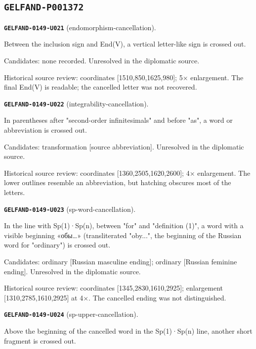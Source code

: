 \documentclass[11pt]{article}
\theoremstyle{definition}
\theoremstyle{remark}
\begin{document}
\subsection*{\texttt{GELFAND-P001372}}
\noindent\leavevmode{}\label{GELFAND-P001372:endomorphism-cancellation:note}\textbf{\texttt{GELFAND-0149-U021}} (endomorphism-cancellation).\par\nopagebreak[4]
Between the inclusion sign and End(V), a vertical letter-like sign is crossed out.\par
Candidates: none recorded. Unresolved in the diplomatic source.\par
Historical source review: coordinates [1510,850,1625,980]; 5× enlargement. The final End(V) is readable; the cancelled letter was not recovered.\par\medskip
\noindent\leavevmode{}\label{GELFAND-P001372:integrability-cancellation:note}\textbf{\texttt{GELFAND-0149-U022}} (integrability-cancellation).\par\nopagebreak[4]
In parentheses after "second-order infinitesimals" and before "as", a word or abbreviation is crossed out.\par
Candidates: transformation [source abbreviation]. Unresolved in the diplomatic source.\par
Historical source review: coordinates [1360,2505,1620,2600]; 4× enlargement. The lower outlines resemble an abbreviation, but hatching obscures most of the letters.\par\medskip
\noindent\leavevmode{}\label{GELFAND-P001372:sp-word-cancellation:note}\textbf{\texttt{GELFAND-0149-U023}} (sp-word-cancellation).\par\nopagebreak[4]
In the line with Sp(1)·Sp(n), between "for" and "definition (1)", a word with a visible beginning «обы…» (transliterated "oby...", the beginning of the Russian word for "ordinary") is crossed out.\par
Candidates: ordinary [Russian masculine ending]; ordinary [Russian feminine ending]. Unresolved in the diplomatic source.\par
Historical source review: coordinates [1345,2830,1610,2925]; enlargement [1310,2785,1610,2925] at 4×. The cancelled ending was not distinguished.\par\medskip
\noindent\leavevmode{}\label{GELFAND-P001372:sp-upper-cancellation:note}\textbf{\texttt{GELFAND-0149-U024}} (sp-upper-cancellation).\par\nopagebreak[4]
Above the beginning of the cancelled word in the Sp(1)·Sp(n) line, another short fragment is crossed out.\par
\end{document}

